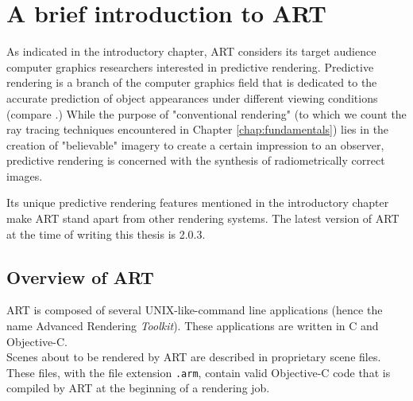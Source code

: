 \section{A brief introduction to ART}
\label{chap:art}

As indicated in the introductory chapter, ART considers its target audience computer graphics researchers interested in predictive rendering. Predictive rendering is a branch of the computer graphics field that is dedicated to the accurate prediction of object appearances under different viewing conditions (compare \cite{wilkie2009predictive}.) While the purpose of "conventional rendering" (to which we count the ray tracing techniques encountered in Chapter \ref{chap:fundamentals}) lies in the creation of "believable" imagery to create a certain impression to an observer, predictive rendering is concerned with the synthesis of radiometrically correct images.

Its unique predictive rendering features mentioned in the introductory chapter make ART stand apart from other rendering systems. The latest version of ART at the time of writing this thesis is 2.0.3.


\subsection{Overview of ART}
ART is composed of several UNIX-like-command line applications (hence the name Advanced Rendering \emph{Toolkit}). These applications are written in C and Objective-C.
\\

Scenes about to be rendered by ART are described in proprietary scene files. These files, with the file extension \texttt{.arm}, contain valid Objective-C code that is compiled by ART at the beginning of a rendering job.

